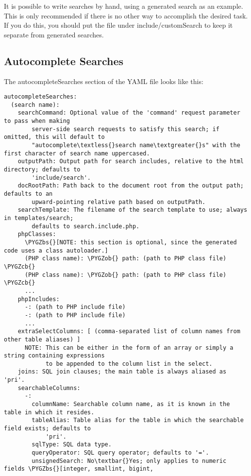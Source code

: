 \documentclass[letterpaper,10pt,english]{sphinxmanual}
\def\PYGZbs{\char`\\}
\def\PYGZob{\char`\{}
\def\PYGZcb{\char`\}}
\begin{document}
It is possible to write searches by hand, using a generated search as an example.  This is only
recommended if there is no other way to accomplish the desired task.  If you do this, you should put
the file under include/customSearch to keep it separate from generated searches.


\subsection{Autocomplete Searches}
\label{jaxFrameworkGuide:autocomplete-searches}
The autocompleteSearches section of the YAML file looks like this:

\begin{Verbatim}[commandchars=\\\{\}]
autocompleteSearches:
  (search name):
    searchCommand: Optional value of the 'command' request parameter to pass when making
        server-side search requests to satisfy this search; if omitted, this will default to
        "autocomplete\textless{}search name\textgreater{}s" with the first character of search name uppercased.
    outputPath: Output path for search includes, relative to the html directory; defaults to
        'include/search'.
    docRootPath: Path back to the document root from the output path; defaults to an
        upward-pointing relative path based on outputPath.
    searchTemplate: The filename of the search template to use; always in templates/search;
        defaults to search.include.php.
    phpClasses:
      \PYGZbs{}[NOTE: this section is optional, since the generated code uses a class autoloader.]
      (PHP class name): \PYGZob{} path: (path to PHP class file) \PYGZcb{}
      (PHP class name): \PYGZob{} path: (path to PHP class file) \PYGZcb{}
      ...
    phpIncludes:
      -: (path to PHP include file)
      -: (path to PHP include file)
      ...
    extraSelectColumns: [ (comma-separated list of column names from other table aliases) ]
      NOTE: This can be either in the form of an array or simply a string containing expressions
            to be appended to the column list in the select.
    joins: SQL join clauses; the main table is always aliased as 'pri'.
    searchableColumns:
      -:
        columnName: Searchable column name, as it is known in the table in which it resides.
        tableAlias: Table alias for the table in which the searchable field exists; defaults to
            'pri'.
        sqlType: SQL data type.
        queryOperator: SQL query operator; defaults to '='.
        unsignedSearch: No\textbar{}Yes; only applies to numeric fields \PYGZbs{}[integer, smallint, bigint,

\end{Verbatim}
\end{document}

